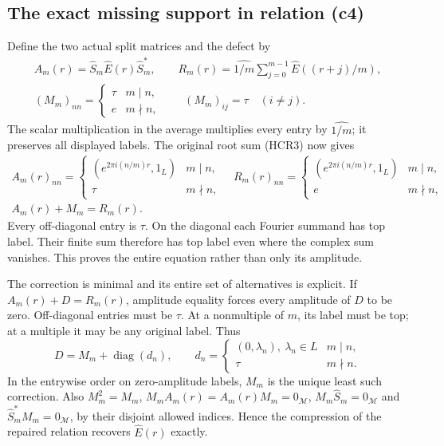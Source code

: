 \subsection{The exact missing support in relation (c4)}

Define the two actual split matrices and the defect by
\begin{equation}\tag{HCR10}
\begin{gathered}
 A_m(r)=\widehat S_m\widehat E(r)\widehat S_m^*,\qquad
 R_m(r)=\widehat{1/m}\sum_{j=0}^{m-1}\widehat E((r+j)/m),\\
 (M_m)_{nn}=\begin{cases}\tau&m\mid n,\\e&m\nmid n,\end{cases}
       \qquad (M_m)_{ij}=\tau\quad(i\ne j).
\end{gathered}
\end{equation}
The scalar multiplication in the average multiplies every
entry by $\widehat{1/m}$; it preserves all displayed labels.
The original root sum (HCR3) now gives
\begin{equation}\tag{HCR11}
\begin{gathered}
 A_m(r)_{nn}=
 \begin{cases}(e^{2\pi i(n/m)r},1_L)&m\mid n,\\\tau&m\nmid n,
 \end{cases}\quad
 R_m(r)_{nn}=
 \begin{cases}(e^{2\pi i(n/m)r},1_L)&m\mid n,\\e&m\nmid n,
 \end{cases}\\
 \boxed{A_m(r)+M_m=R_m(r).}
\end{gathered}
\end{equation}
Every off-diagonal entry is $\tau$. On the diagonal each
Fourier summand has top label. Their finite sum therefore
has top label even where the complex sum vanishes. This
proves the entire equation rather than only its amplitude.

The correction is minimal and its entire set of alternatives
is explicit. If $A_m(r)+D=R_m(r)$, amplitude equality forces
every amplitude of $D$ to be zero. Off-diagonal entries must
be $\tau$. At a nonmultiple of $m$, its label must be top;
at a multiple it may be any original label. Thus
\begin{equation}\tag{HCR12}
 D=M_m+\operatorname{diag}(d_n),\qquad
 d_n=\begin{cases}(0,\lambda_n),\ \lambda_n\in L&m\mid n,\\
                    \tau&m\nmid n.
       \end{cases}
\end{equation}
In the entrywise order on zero-amplitude labels, $M_m$ is
the unique least such correction. Also $M_m^2=M_m$,
$M_mA_m(r)=A_m(r)M_m=0_{\mathscr M}$,
$M_m\widehat S_m=0_{\mathscr M}$ and
$\widehat S_m^*M_m=0_{\mathscr M}$, by their disjoint
allowed indices. Hence the compression of the repaired
relation recovers $\widehat E(r)$ exactly.


